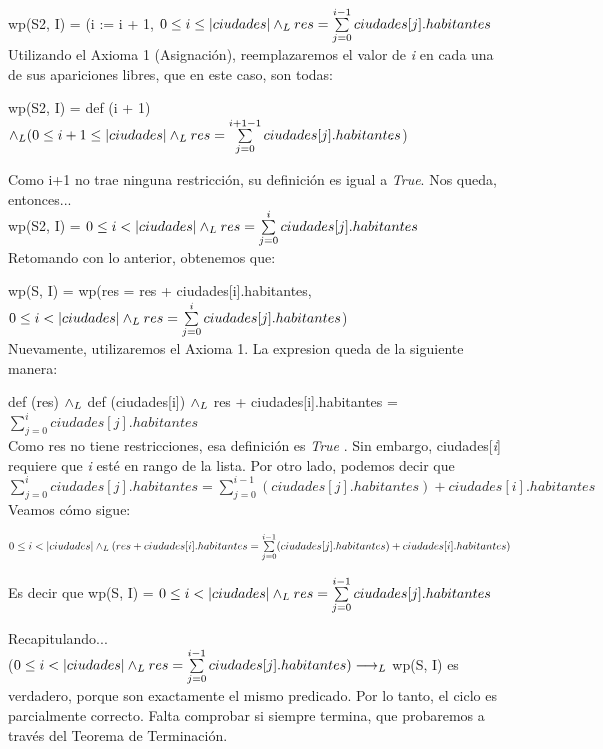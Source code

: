 \documentclass[10pt,a4paper]{article}
\begin{document}
\begin{enumerate}
    wp(S2, I) = (i := i + 1, $0 \leq i \leq |ciudades| \land _L res = \sum\limits_{j=0}^{i - 1}ciudades[j].habitantes$ \\

    Utilizando el Axioma 1 (Asignación), reemplazaremos el valor de \textit{i} en cada una de sus apariciones libres, que en este caso, son todas:
    
    wp(S2, I) = def (i + 1) $\land _L (0 \leq i+1 \leq |ciudades| \land _L res = \sum\limits_{j=0}^{i + 1 - 1}ciudades[j].habitantes$)
    
    Como i+1 no trae ninguna restricción, su definición es igual a \textit{True}. Nos queda, entonces...\\
    
    wp(S2, I) = $0 \leq i < |ciudades| \land _L res = \sum\limits_{j=0}^{i}ciudades[j].habitantes$\\
    
    Retomando con lo anterior, obtenemos que:

    wp(S, I) = wp(res = res + ciudades[i].habitantes, $0 \leq i < |ciudades| \land _L res = \sum\limits_{j=0}^{i}ciudades[j].habitantes$)\\

    Nuevamente, utilizaremos el Axioma 1. La expresion queda de la siguiente manera:
    
    def (res) $\land _L$ def (ciudades[i]) $\land _L$ res + ciudades[i].habitantes = $\sum\limits_{j=0}^{i}ciudades[j].habitantes$\\

    Como res no tiene restricciones, esa definición es \textit{True }. Sin embargo, ciudades[\textit{i}] requiere que \textit{i} esté en rango de la lista. Por otro lado, podemos decir que $\sum\limits_{j=0}^{i}ciudades[j].habitantes = \sum\limits_{j=0}^{i-1}(ciudades[j].habitantes) + ciudades[i].habitantes$ Veamos cómo sigue:

    $0 \leq i < |ciudades| \land _L (res + ciudades[i].habitantes = \sum\limits_{j=0}^{i-1}(ciudades[j].habitantes) + ciudades[i].habitantes)$ 
    
    Es decir que wp(S, I) = $0 \leq i < |ciudades| \land _L res = \sum\limits_{j=0}^{i-1}ciudades[j].habitantes$
 
\end{enumerate}

    Recapitulando...\\

    ($0 \leq i < |ciudades| \land _L res = \sum\limits_{j=0}^{i - 1}ciudades[j].habitantes) \longrightarrow _L$ wp(S, I) es verdadero, porque son exactamente el mismo predicado. Por lo tanto, el ciclo es parcialmente correcto. Falta comprobar si siempre termina, que probaremos a través del Teorema de Terminación.\\
    
\end{document}
